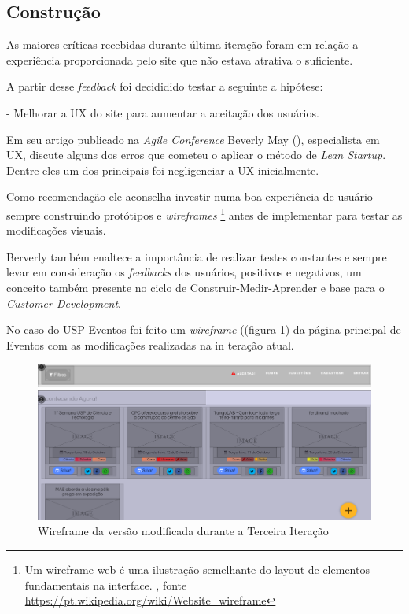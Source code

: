 \subsection{Construção}
	\par As maiores críticas recebidas durante última iteração foram em relação  a experiência proporcionada pelo site que não estava atrativa o suficiente.
	\par A partir desse \emph{feedback} foi decididido testar a seguinte a hipótese: 
	\par - Melhorar  a UX do site para aumentar a aceitação dos usuários.
	\par Em seu artigo  publicado na \emph{Agile Conference}  Beverly May (\cite{beverly:2012}), especialista em UX, discute alguns dos erros que cometeu o aplicar o método de \emph{Lean Startup}. Dentre eles um dos principais foi negligenciar a UX inicialmente.
	\par Como recomendação  ele aconselha investir numa boa experiência de usuário sempre construindo protótipos e \emph{wireframes} \footnote{ Um wireframe web é uma ilustração semelhante do layout de elementos fundamentais na interface. , fonte \url{https://pt.wikipedia.org/wiki/Website_wireframe}} antes de implementar para testar as modificações visuais.
	 \par Berverly também enaltece a importância de realizar testes constantes e sempre levar em consideração os \emph{feedbacks} dos usuários, positivos e negativos, um conceito também presente no ciclo de Construir-Medir-Aprender e base para o \emph{Customer Development}.
	\par No caso do USP Eventos foi feito um \emph{wireframe} ((figura \ref{fig:wireframe}) da página principal de Eventos com as modificações realizadas na in	teração atual.
\begin{figure}[htb]
\includegraphics[width=15cm]{figuras/wireframe}
\caption{\label{fig:wireframe} Wireframe da versão modificada durante a Terceira Iteração}
\end{figure}
